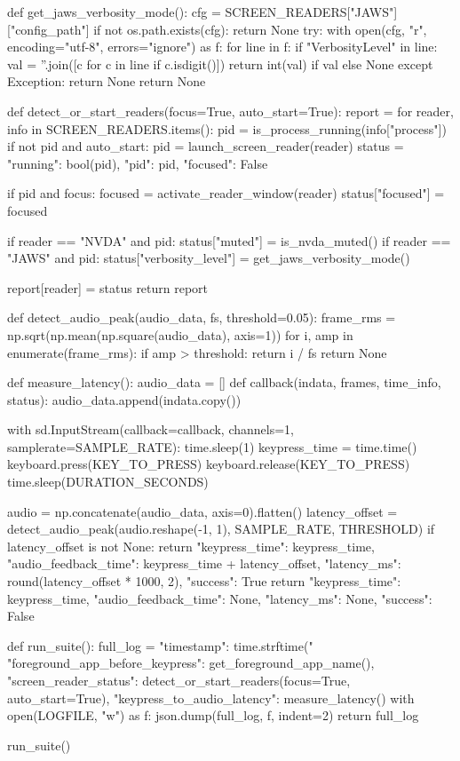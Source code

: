 \begin{pyverbatim}
	def get_jaws_verbosity_mode():
	cfg = SCREEN_READERS["JAWS"]["config_path"]
	if not os.path.exists(cfg):
	return None
	try:
	with open(cfg, "r", encoding="utf-8", errors="ignore") as f:
	for line in f:
	if "VerbosityLevel" in line:
	val = ''.join([c for c in line if c.isdigit()])
	return int(val) if val else None
	except Exception:
	return None
	return None

	def detect_or_start_readers(focus=True, auto_start=True):
	report = {}
	for reader, info in SCREEN_READERS.items():
	pid = is_process_running(info["process"])
	if not pid and auto_start:
	pid = launch_screen_reader(reader)
	status = {"running": bool(pid), "pid": pid, "focused": False}

	if pid and focus:
	focused = activate_reader_window(reader)
	status["focused"] = focused

	if reader == "NVDA" and pid:
	status["muted"] = is_nvda_muted()
	if reader == "JAWS" and pid:
	status["verbosity_level"] = get_jaws_verbosity_mode()

	report[reader] = status
	return report

	def detect_audio_peak(audio_data, fs, threshold=0.05):
	frame_rms = np.sqrt(np.mean(np.square(audio_data), axis=1))
	for i, amp in enumerate(frame_rms):
	if amp > threshold:
	return i / fs
	return None

	def measure_latency():
	audio_data = []
	def callback(indata, frames, time_info, status):
	audio_data.append(indata.copy())

	with sd.InputStream(callback=callback, channels=1, samplerate=SAMPLE_RATE):
	time.sleep(1)
	keypress_time = time.time()
	keyboard.press(KEY_TO_PRESS)
	keyboard.release(KEY_TO_PRESS)
	time.sleep(DURATION_SECONDS)

	audio = np.concatenate(audio_data, axis=0).flatten()
	latency_offset = detect_audio_peak(audio.reshape(-1, 1), SAMPLE_RATE, THRESHOLD)
	if latency_offset is not None:
	return {
			"keypress_time": keypress_time,
			"audio_feedback_time": keypress_time + latency_offset,
			"latency_ms": round(latency_offset * 1000, 2),
			"success": True
		}
	return {
			"keypress_time": keypress_time,
			"audio_feedback_time": None,
			"latency_ms": None,
			"success": False
		}

	def run_suite():
	full_log = {
	"timestamp": time.strftime("%
	"foreground_app_before_keypress": get_foreground_app_name(),
	"screen_reader_status": detect_or_start_readers(focus=True, auto_start=True),
	"keypress_to_audio_latency": measure_latency()
	}
	with open(LOGFILE, "w") as f:
	json.dump(full_log, f, indent=2)
	return full_log

	run_suite()
\end{pyverbatim}

